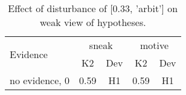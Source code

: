 \begin{table}\begin{tabular}{l|cc|cc}\toprule\multirow{2}{*}{Evidence} & \multicolumn{2}{c}{sneak}& \multicolumn{2}{c}{motive}\\& {K2} & {Dev}& {K2} & {Dev}\\\midrule
no evidence, 0 & \cellcolor{Bittersweet}0.59&\cellcolor{Bittersweet}H1&\cellcolor{Bittersweet}0.59&\cellcolor{Bittersweet}H1\\\bottomrule\end{tabular}\caption{Effect of disturbance of [0.33, 'arbit'] on weak view of hypotheses.}\end{table}